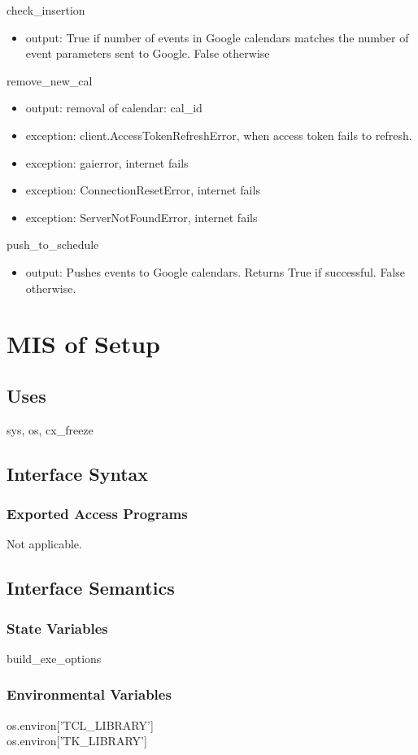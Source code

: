 \documentclass[12pt, titlepage]{article}
\begin{document}
check\_insertion
\begin{itemize}
    \item output: True if number of events in Google calendars matches the number of event parameters sent to Google. False otherwise
\end{itemize}
remove\_new\_cal
\begin{itemize}
    \item output: removal of calendar: cal\_id
    \item exception: client.AccessTokenRefreshError, when access token fails to refresh. 
    \item exception: gaierror, internet fails
    \item exception: ConnectionResetError, internet fails
    \item exception: ServerNotFoundError, internet fails
\end{itemize}
push\_to\_schedule
\begin{itemize}
    \item output: Pushes events to Google calendars. Returns True if successful. False otherwise.
\end{itemize}

\newpage
\color{blue}
\section{MIS of Setup} \label{SecM4}
\subsection{Uses}
sys, os, cx\_freeze

\subsection{Interface Syntax}
\subsubsection{Exported Access Programs}
Not applicable.
\subsection{Interface Semantics}
\subsubsection{State Variables}
build\_exe\_options
\subsubsection{Environmental Variables}
os.environ['TCL\_LIBRARY']\\
os.environ['TK\_LIBRARY']
\end{document}
